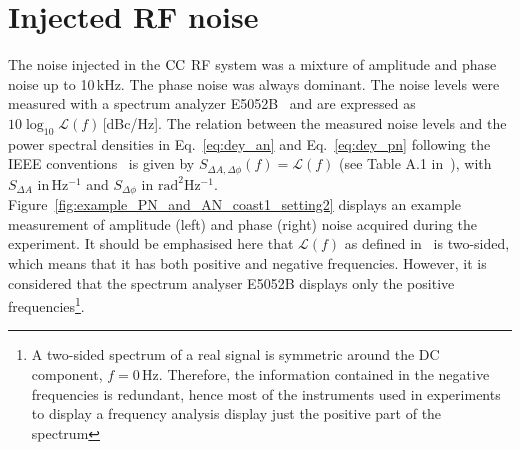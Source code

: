 \section{Injected RF noise}\label{sec:injected_RF_noise}
The noise injected in the ${\mathrm{CC}}$ RF system was a mixture of amplitude and phase noise up to 10\,kHz.
The phase noise was always dominant. The noise levels were measured with a spectrum analyzer E5052B~\cite{E5052B_insight} and are expressed as $10\log_{10}\mathcal{L}(f)$\,[dBc/Hz]. The relation between the measured noise levels and the power spectral densities in Eq.~\eqref{eq:dey_an} and Eq.~\eqref{eq:dey_pn} following the IEEE conventions~\cite{IEEE:4797525} is given by $S_{\Delta A, \Delta \phi}(f) = \mathcal{L}(f)$ (see Table A.1 in~\cite{IEEE:4797525}), with $S_{\Delta A}$ in\,Hz$^{-1}$ and $S_{\Delta \phi}$ in $\mathrm{rad^2 Hz^{-1}}$. Figure~\ref{fig:example_PN_and_AN_coast1_setting2} displays an example measurement of amplitude (left) and phase (right) noise acquired during the experiment. It should be emphasised here that $\mathcal{L}(f)$ as defined in~\cite{IEEE:4797525} is two-sided, which means that it has both positive and negative frequencies. However, it is considered that the spectrum analyser E5052B displays only the positive frequencies\footnote{A two-sided spectrum of a real signal is symmetric around the DC component, $f=0$\,Hz. Therefore, the information contained in the negative frequencies is redundant, hence most of the instruments used in experiments to display a frequency analysis display just the positive part of the spectrum}.

